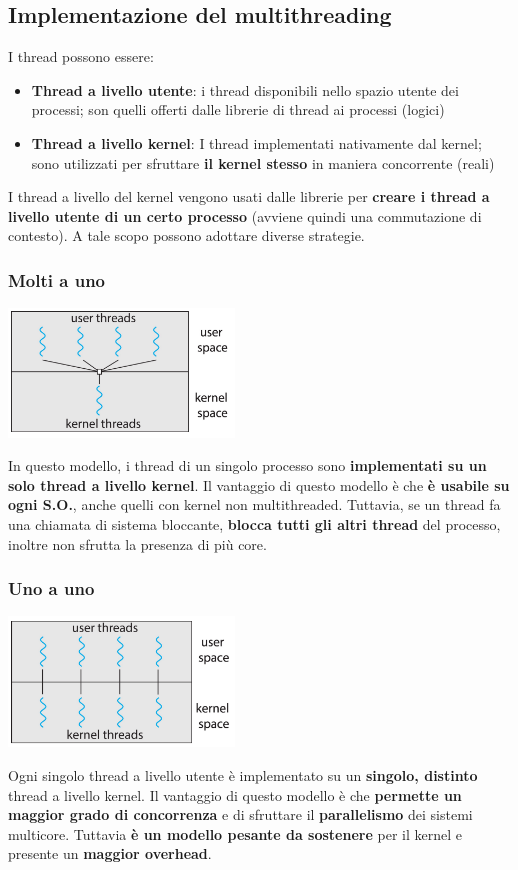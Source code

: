 \documentclass[12pt]{article}
\begin{document}
\subsection{Implementazione del multithreading}
I thread possono essere:
\begin{itemize}
    \item \textbf{Thread a livello utente}: i thread disponibili nello spazio utente dei processi; son quelli offerti dalle librerie di thread ai processi (logici)
    \item \textbf{Thread a livello kernel}: I thread implementati nativamente dal kernel; sono utilizzati per sfruttare \textbf{il kernel stesso} in maniera concorrente (reali)
\end{itemize}
I thread a livello del kernel vengono usati dalle librerie per \textbf{creare i thread a livello utente di un certo processo} (avviene quindi una commutazione di contesto). A tale scopo possono adottare diverse strategie.
\subsubsection{Molti a uno}
\begin{center}
    \includegraphics[width = 0.45\textwidth]{Images/62.PNG}
\end{center}
In questo modello, i thread di un singolo processo sono \textbf{implementati su un solo thread a livello kernel}. Il vantaggio di questo modello è che \textbf{è usabile su ogni S.O.}, anche quelli con kernel non multithreaded. Tuttavia, se un thread fa una chiamata di sistema bloccante, \textbf{blocca tutti gli altri thread} del processo, inoltre non sfrutta la presenza di più core.
\subsubsection{Uno a uno}
\begin{center}
    \includegraphics[width = 0.45\textwidth]{Images/63.PNG}
\end{center}
Ogni singolo thread a livello utente è implementato su un \textbf{singolo, distinto} thread a livello kernel. Il vantaggio di questo modello è che \textbf{permette un maggior grado di concorrenza} e di sfruttare il \textbf{parallelismo} dei sistemi multicore. Tuttavia \textbf{è un modello pesante da sostenere} per il kernel e presente un \textbf{maggior overhead}.
\end{document}

